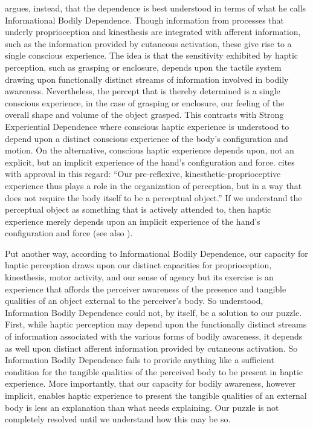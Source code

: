 \citet[chapter 4.8]{Fulkerson:2014ek} argues, instead, that the dependence is best understood in terms of what he calls Informational Bodily Dependence. Though information from processes that underly proprioception and kinesthesis are integrated with afferent information, such as the information provided by cutaneous activation, these give rise to a single conscious experience. The idea is that the sensitivity exhibited by haptic perception, such as grasping or enclosure, depends upon the tactile system drawing upon functionally distinct streams of information involved in bodily awareness. Nevertheless, the percept that is thereby determined is a single conscious experience, in the case of grasping or enclosure, our feeling of the overall shape and volume of the object grasped. This contrasts with Strong Experiential Dependence where conscious haptic experience is understood to depend upon a distinct conscious experience of the body's configuration and motion. On the alternative, conscious haptic experience depends upon, not an explicit, but an implicit experience of the hand's configuration and force. \citet[91]{Fulkerson:2014ek} cites with approval \citet[137]{Gallagher:2005ag} in this regard: ``Our pre-reflexive, kinesthetic-proprioceptive experience thus plays a role in the organization of perception, but in a way that does not require the body itself to be a perceptual object.'' If we understand the perceptual object as something that is actively attended to, then haptic experience merely depends upon an implicit experience of the hand's configuration and force (see also \citealt{Bower:2013aa}).

Put another way, according to Informational Bodily Dependence, our capacity for haptic perception draws upon our distinct capacities for proprioception, kinesthesis, motor activity, and our sense of agency but its exercise is an experience that affords the perceiver awareness of the presence and tangible qualities of an object external to the perceiver's body. So understood, Information Bodily Dependence could not, by itself, be a solution to our puzzle. First, while haptic perception may depend upon the functionally distinct streams of information associated with the various forms of bodily awareness, it depends as well upon distinct afferent information provided by cutaneous activation. So Information Bodily Dependence fails to provide anything like a sufficient condition for the tangible qualities of the perceived body to be present in haptic experience. More importantly, that our capacity for bodily awareness, however implicit, enables haptic experience to present the tangible qualities of an external body is less an explanation than what needs explaining. Our puzzle is not completely resolved until we understand how this may be so.

